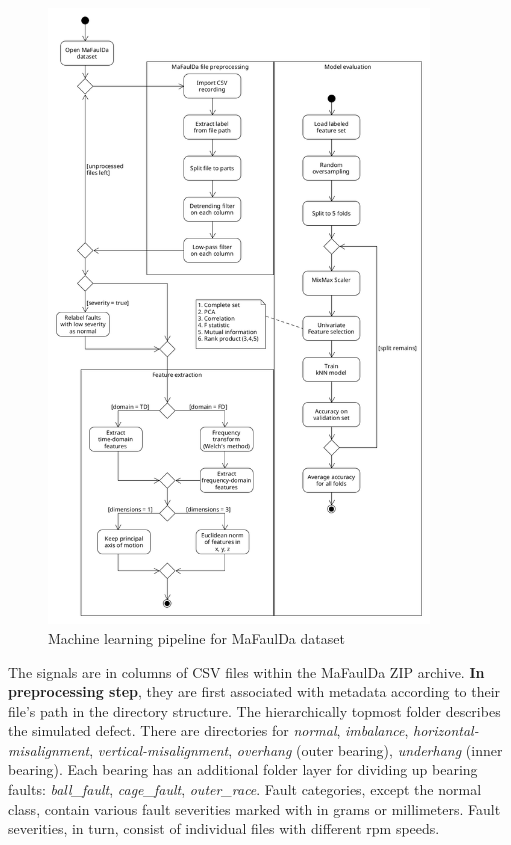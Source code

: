 \begin{figure}[h]
    \centering
	\includegraphics[width=0.9\textwidth]{assets/design/pipeline-design.png}
	\caption{Machine learning pipeline for MaFaulDa dataset}
	\label{fig:design:ml-pipeline}
\end{figure}
\afterpage{\clearpage}

The signals are in columns of CSV files within the MaFaulDa ZIP archive. \textbf{In preprocessing step}, they are first associated with metadata according to their file's path in the directory structure. The hierarchically topmost folder describes the simulated defect. There are directories for \emph{normal}, \emph{imbalance}, \emph{horizontal-misalignment}, \emph{vertical-misalignment}, \emph{overhang} (outer bearing), \emph{underhang} (inner bearing). Each bearing has an additional folder layer for dividing up bearing faults: \emph{ball\_fault}, \emph{cage\_fault}, \emph{outer\_race}. Fault categories, except the normal class, contain various fault severities marked with in grams or millimeters. Fault severities, in turn, consist of individual files with different rpm speeds. 

